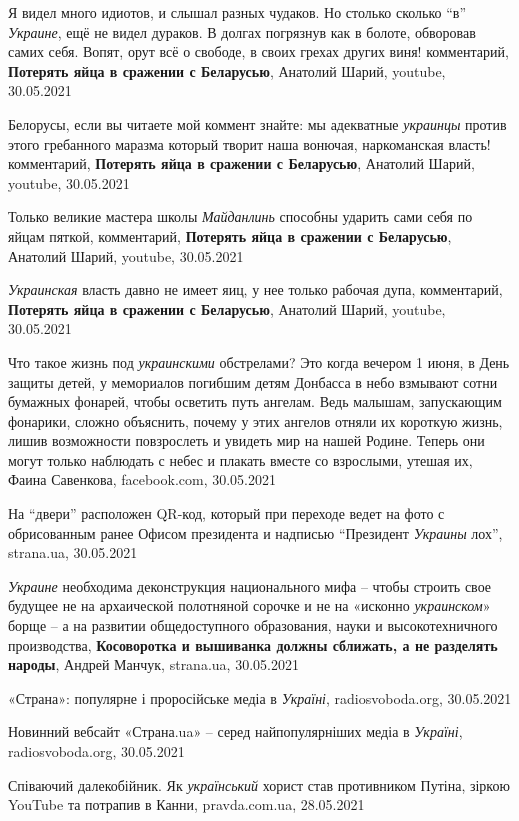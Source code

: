Я видел много идиотов, и слышал разных чудаков. Но столько сколько \enquote{в}
\emph{Украине}, ещё не видел дураков. В долгах погрязнув как в болоте,
обворовав самих себя. Вопят, орут всё о свободе, в своих грехах других виня!
комментарий, \textbf{Потерять яйца в сражении с Беларусью}, Анатолий Шарий,
youtube, 30.05.2021

Белорусы, если вы читаете мой коммент знайте: мы адекватные \emph{украинцы}
против этого гребанного маразма который творит наша вонючая, наркоманская
власть!  комментарий, \textbf{Потерять яйца в сражении с Беларусью}, Анатолий
Шарий, youtube, 30.05.2021

Только великие мастера школы \emph{Майданлинь} способны ударить сами себя по
яйцам пяткой, комментарий, \textbf{Потерять яйца в сражении с Беларусью},
Анатолий Шарий, youtube, 30.05.2021

\emph{Украинская} власть давно не имеет яиц, у нее только рабочая дупа,
комментарий, \textbf{Потерять яйца в сражении с Беларусью}, Анатолий Шарий,
youtube, 30.05.2021

Что такое жизнь под \emph{украинскими} обстрелами? Это когда вечером 1 июня, в
День защиты детей, у мемориалов погибшим детям Донбасса в небо взмывают сотни
бумажных фонарей, чтобы осветить путь ангелам. Ведь малышам, запускающим
фонарики, сложно объяснить, почему у этих ангелов отняли их короткую жизнь,
лишив возможности повзрослеть и увидеть мир на нашей Родине. Теперь они могут
только наблюдать с небес и плакать вместе со взрослыми, утешая их, Фаина
Савенкова, facebook.com, 30.05.2021

На \enquote{двери} расположен QR-код, который при переходе ведет на фото с
обрисованным ранее Офисом президента и надписью \enquote{Президент
\emph{Украины} лох}, strana.ua, 30.05.2021

\emph{Украине} необходима деконструкция национального мифа – чтобы строить свое
будущее не на архаической полотняной сорочке и не на «исконно
\emph{украинском}» борще – а на развитии общедоступного образования, науки и
высокотехничного производства, \textbf{Косоворотка и вышиванка должны сближать,
а не разделять народы}, Андрей Манчук, strana.ua, 30.05.2021

«Страна»: популярне і проросійське медіа в \emph{Україні}, radiosvoboda.org,
30.05.2021

Новинний вебсайт «Страна.ua» – серед найпопулярніших медіа в \emph{Україні},
radiosvoboda.org, 30.05.2021

Співаючий далекобійник. Як \emph{український} хорист став противником Путіна,
зіркою YouTube та потрапив в Канни, pravda.com.ua, 28.05.2021

